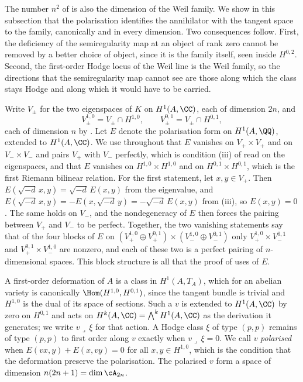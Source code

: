 The number $n^{2}$ of  is also the dimension of the
Weil family. We show in this subsection that the polarisation identifies the
annihilator with the tangent space to the family, canonically and in every
dimension. Two consequences follow. First, the deficiency of the
semiregularity map at an object of rank zero cannot be removed by a better
choice of object, since it is the family itself, seen inside $H^{0,2}$.
Second, the first-order Hodge locus of the Weil line is the Weil family, so
the directions that the semiregularity map cannot see are those along which
the class stays Hodge and along which it would have to be carried.

Write $V_{\pm}$ for the two eigenspaces of $K$ on $H^{1}(A,\CC)$, each of
dimension $2n$, and
\[
  V_{\pm}^{1,0}=V_{\pm}\cap H^{1,0},\qquad
  V_{\pm}^{0,1}=V_{\pm}\cap H^{0,1},
\]
each of dimension $n$ by . Let $E$ denote the
polarisation form on $H^{1}(A,\QQ)$, extended to $H^{1}(A,\CC)$. We use
throughout that $E$ vanishes on $V_{+}\times V_{+}$ and on $V_{-}\times V_{-}$
and pairs $V_{+}$ with $V_{-}$ perfectly, which is condition (iii) of
 read on the eigenspaces, and that $E$ vanishes on
$H^{1,0}\times H^{1,0}$ and on $H^{0,1}\times H^{0,1}$, which is the first
Riemann bilinear relation. For the first statement, let $x,y\in V_{+}$. Then
$E(\sqrt{-d}\,x,y)=\sqrt{-d}\,E(x,y)$ from the eigenvalue, and
$E(\sqrt{-d}\,x,y)=-E(x,\sqrt{-d}\,y)=-\sqrt{-d}\,E(x,y)$ from
(iii), so $E(x,y)=0$. The same holds on $V_{-}$, and the
nondegeneracy of $E$ then forces the pairing between $V_{+}$ and $V_{-}$ to
be perfect. Together, the two vanishing statements say that of the four
blocks of $E$ on
$(V_{+}^{1,0}\oplus V_{+}^{0,1})\times(V_{-}^{1,0}\oplus V_{-}^{0,1})$ only
$V_{+}^{1,0}\times V_{-}^{0,1}$ and $V_{+}^{0,1}\times V_{-}^{1,0}$ are
nonzero, and each of these two is a perfect pairing of $n$-dimensional
spaces. This block structure is all that the proof of 
uses of $E$.

A first-order deformation of $A$ is a class in $H^{1}(A,T_{A})$, which for an
abelian variety is canonically $\Hom(H^{1,0},H^{0,1})$, since the tangent
bundle is trivial and $H^{1,0}$ is the dual of its space of sections. Such a
$v$ is extended to $H^{1}(A,\CC)$ by zero on $H^{0,1}$ and acts on
$H^{k}(A,\CC)=\bigwedge^{k}H^{1}(A,\CC)$ as the derivation it generates; we
write $v\lrcorner\,\xi$ for that action. A Hodge class $\xi$ of type $(p,p)$
remains of type $(p,p)$ to first order along $v$ exactly when
$v\lrcorner\,\xi=0$. We call $v$ \emph{polarised} when
$E(vx,y)+E(x,vy)=0$ for all $x,y\in H^{1,0}$, which is the condition that the
deformation preserve the polarisation. The polarised $v$ form a space of
dimension $n(2n+1)=\dim\cA_{2n}$.

